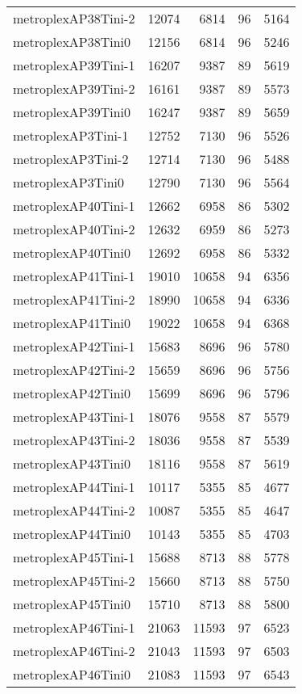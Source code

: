 \begin{longtable}{lrrrr}
metroplexAP38Tini-2 & 12074 & 6814 & 96 & 5164 \\
metroplexAP38Tini0 & 12156 & 6814 & 96 & 5246 \\
metroplexAP39Tini-1 & 16207 & 9387 & 89 & 5619 \\
metroplexAP39Tini-2 & 16161 & 9387 & 89 & 5573 \\
metroplexAP39Tini0 & 16247 & 9387 & 89 & 5659 \\
metroplexAP3Tini-1 & 12752 & 7130 & 96 & 5526 \\
metroplexAP3Tini-2 & 12714 & 7130 & 96 & 5488 \\
metroplexAP3Tini0 & 12790 & 7130 & 96 & 5564 \\
metroplexAP40Tini-1 & 12662 & 6958 & 86 & 5302 \\
metroplexAP40Tini-2 & 12632 & 6959 & 86 & 5273 \\
metroplexAP40Tini0 & 12692 & 6958 & 86 & 5332 \\
metroplexAP41Tini-1 & 19010 & 10658 & 94 & 6356 \\
metroplexAP41Tini-2 & 18990 & 10658 & 94 & 6336 \\
metroplexAP41Tini0 & 19022 & 10658 & 94 & 6368 \\
metroplexAP42Tini-1 & 15683 & 8696 & 96 & 5780 \\
metroplexAP42Tini-2 & 15659 & 8696 & 96 & 5756 \\
metroplexAP42Tini0 & 15699 & 8696 & 96 & 5796 \\
metroplexAP43Tini-1 & 18076 & 9558 & 87 & 5579 \\
metroplexAP43Tini-2 & 18036 & 9558 & 87 & 5539 \\
metroplexAP43Tini0 & 18116 & 9558 & 87 & 5619 \\
metroplexAP44Tini-1 & 10117 & 5355 & 85 & 4677 \\
metroplexAP44Tini-2 & 10087 & 5355 & 85 & 4647 \\
metroplexAP44Tini0 & 10143 & 5355 & 85 & 4703 \\
metroplexAP45Tini-1 & 15688 & 8713 & 88 & 5778 \\
metroplexAP45Tini-2 & 15660 & 8713 & 88 & 5750 \\
metroplexAP45Tini0 & 15710 & 8713 & 88 & 5800 \\
metroplexAP46Tini-1 & 21063 & 11593 & 97 & 6523 \\
metroplexAP46Tini-2 & 21043 & 11593 & 97 & 6503 \\
metroplexAP46Tini0 & 21083 & 11593 & 97 & 6543 \\

\end{longtable}
